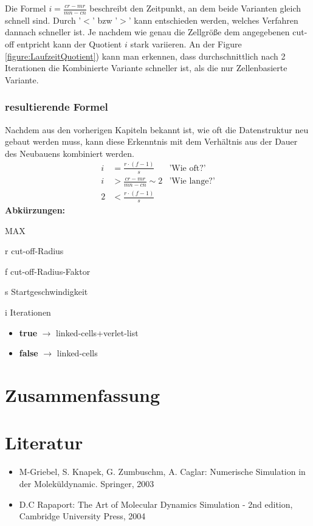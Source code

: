 \documentclass[
	12pt,
	a4paper,
	BCOR10mm,
	DIV14,
	headsepline,
]{scrreprt}
\begin{document}
Die Formel $i=\frac{cr-mr}{mn-cn}$ beschreibt den Zeitpunkt, an dem beide Varianten gleich schnell sind. Durch '$<$' bzw '$>$' kann entschieden werden, welches Verfahren dannach schneller ist. Je nachdem wie genau die Zellgröße dem angegebenen cut-off entpricht kann der Quotient $i$ stark variieren. An der Figure \ref{figure:LaufzeitQuotient}) kann man erkennen, dass durchschnittlich nach 2 Iterationen die Kombinierte Variante schneller ist, als die nur Zellenbasierte Variante.
\newpage
\subsection{resultierende Formel}
	Nachdem aus den vorherigen Kapiteln bekannt ist, wie oft die Datenstruktur neu gebaut werden muss, kann diese Erkenntnis mit dem Verhältnis aus der Dauer des Neubauens kombiniert werden. 
	\begin{align*}
		i&=\frac{r \cdot (f - 1)}{s} &\text{'Wie oft?'}\\
		i&>\frac{cr-mr}{mn-cn}\sim 2&\text{'Wie lange?'}\\
		2&<\frac{r \cdot (f - 1)}{s}
	\end{align*}
	\footnotesize\textbf{Abkürzungen:}\begin{labeling}[~--]{MAX}
		\item[r] cut-off-Radius
		\item[f] cut-off-Radius-Faktor
		\item[s] Startgeschwindigkeit
		\item[i] Iterationen
	\end{labeling}
	
	\begin{itemize}
		\item \textbf{true} $\rightarrow$ linked-cells+verlet-list
		\item \textbf{false} $\rightarrow$ linked-cells
	\end{itemize}

\chapter{Zusammenfassung}
\label{Zusammenfassung}


\chapter{Literatur}
\label{Literatur}

\begin{itemize}
	\item M-Griebel, S. Knapek, G. Zumbuschm, A. Caglar: Numerische Simulation in der Moleküldynamic. Springer, 2003
	\item D.C Rapaport: The Art of Molecular Dynamics Simulation - 2nd edition, Cambridge University Press, 2004
\end{itemize}
\end{document}
